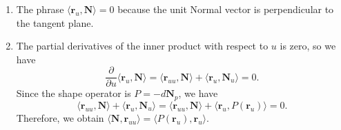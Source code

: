 \documentclass[12pt]{article}
\begin{document}
\begin{enumerate}
  \item The phrase \(\langle \mathbf{r}_u, \mathbf{N} \rangle = 0\)
        because the unit Normal vector
        is perpendicular to the tangent plane.

  \item The partial derivatives of the inner product
        with respect to \(u\) is zero, so we have
        \[
          \frac{\partial}{\partial u} \langle \mathbf{r}_u, \mathbf{N} \rangle = \langle \mathbf{r}_{uu}, \mathbf{N} \rangle + \langle \mathbf{r}_u, \mathbf{N}_u \rangle = 0.
        \]
        Since the shape operator is \(P = -d\mathbf{N}_p \), we have
        \[
          \langle \mathbf{r}_{uu}, \mathbf{N} \rangle + \langle \mathbf{r}_u, \mathbf{N}_u \rangle = \langle \mathbf{r}_{uu}, \mathbf{N} \rangle + \langle \mathbf{r}_u, P(\mathbf{r}_u) \rangle = 0.
        \]
        Therefore, we obtain \( \langle \mathbf{N},  \mathbf{r}_{uu} \rangle = \langle P(\mathbf{r}_{u}), \mathbf{r}_{u} \rangle \).


\end{enumerate}
\end{document}
